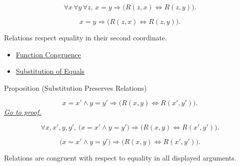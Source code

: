 \begin{remark*}
\[
\forall x\,\forall y\,\forall z,\,
x=y \Longrightarrow
\bigl(R(z,x)\Longleftrightarrow R(z,y)\bigr).
\]
\end{remark*}

\begin{remark*}
\[
x=y \Longrightarrow \bigl(R(z,x)\Longleftrightarrow R(z,y)\bigr).
\]
\end{remark*}

\begin{remark*}[Interpretation]
Relations respect equality in their second coordinate.
\end{remark*}

\begin{dependencies}
\begin{itemize}
  \item \hyperref[thm:axiomatic-equality-function-congruence]{Function Congruence}
  \item \hyperref[ax:equality-substitution]{Substitution of Equals}
\end{itemize}
\end{dependencies}

\begin{propositionbox}{Proposition (Substitution Preserves Relations)}
\begin{proposition}
\label{prop:substitution-preserves-relations-full}
\[
x=x' \land y=y' \Longrightarrow
\bigl(R(x,y)\Longleftrightarrow R(x',y')\bigr).
\]
\hyperref[prf:substitution-preserves-relations-full]{\textit{Go to proof.}}
\end{proposition}
\end{propositionbox}

\begin{remark*}
\[
\forall x,x',y,y',\,
\bigl(x=x'\land y=y'\bigr)
\Longrightarrow
\bigl(R(x,y)\Longleftrightarrow R(x',y')\bigr).
\]
\end{remark*}

\begin{remark*}
\[
\bigl(x=x'\land y=y'\bigr)
\Longrightarrow
\bigl(R(x,y)\Longleftrightarrow R(x',y')\bigr).
\]
\end{remark*}

\begin{remark*}[Interpretation]
Relations are congruent with respect to equality in all displayed arguments.
\end{remark*}

